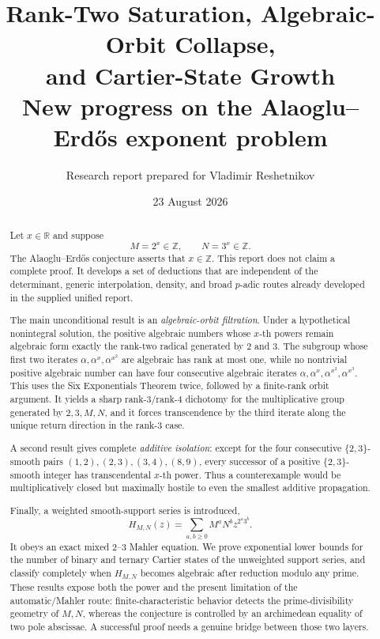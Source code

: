 \documentclass[11pt]{article}
\title{\bfseries Rank-Two Saturation, Algebraic-Orbit Collapse,\\
and Cartier-State Growth\\[0.45em]
\large New progress on the Alaoglu--Erd\H{o}s exponent problem}
\author{Research report prepared for Vladimir Reshetnikov}
\date{23 August 2026}
\theoremstyle{definition}
\newcommand{\Z}{\mathbb{Z}}
\newcommand{\R}{\mathbb{R}}
\begin{document}
\maketitle

\begin{abstract}
Let $x\in\R$ and suppose
\[
        M=2^x\in\Z,\qquad N=3^x\in\Z.
\]
The Alaoglu--Erd\H{o}s conjecture asserts that $x\in\Z$.  This report does not
claim a complete proof.  It develops a set of deductions that are independent
of the determinant, generic interpolation, density, and broad $p$-adic routes
already developed in the supplied unified report.

The main unconditional result is an \emph{algebraic-orbit filtration}.  Under
a hypothetical nonintegral solution, the positive algebraic numbers whose
$x$-th powers remain algebraic form exactly the rank-two radical generated by
$2$ and $3$.  The subgroup whose first two iterates
$\alpha,\alpha^x,\alpha^{x^2}$ are algebraic has rank at most one, while no
nontrivial positive algebraic number can have four consecutive algebraic
iterates
$\alpha,\alpha^x,\alpha^{x^2},\alpha^{x^3}$.  This uses the Six Exponentials
Theorem twice, followed by a finite-rank orbit argument.  It yields a sharp
rank-$3$/rank-$4$ dichotomy for the multiplicative group generated by
$2,3,M,N$, and it forces transcendence by the third iterate along the unique
return direction in the rank-$3$ case.

A second result gives complete \emph{additive isolation}: except for the four
consecutive $\{2,3\}$-smooth pairs
$(1,2),(2,3),(3,4),(8,9)$, every successor of a positive $\{2,3\}$-smooth
integer has transcendental $x$-th power.  Thus a counterexample would be
multiplicatively closed but maximally hostile to even the smallest additive
propagation.

Finally, a weighted smooth-support series is introduced,
\[
  H_{M,N}(z)=\sum_{a,b\geq0}M^aN^b z^{2^a3^b}.
\]
It obeys an exact mixed $2$--$3$ Mahler equation.  We prove exponential lower
bounds for the number of binary and ternary Cartier states of the unweighted
support series, and classify completely when $H_{M,N}$ becomes algebraic
after reduction modulo any prime.  These results expose both the power and the
present limitation of the automatic/Mahler route: finite-characteristic
behavior detects the prime-divisibility geometry of $M,N$, whereas the
conjecture is controlled by an archimedean equality of two pole abscissae.  A
successful proof needs a genuine bridge between those two layers.
\end{abstract}
\end{document}
